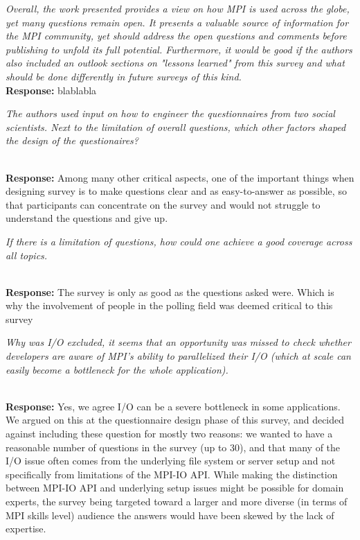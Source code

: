 \documentclass[11pt]{article}
\newcommand{\response}[2]{{\vspace{5mm}\noindent{\bf Comment:} \em #1}\\%
  {\bf Response:} #2}
\newcommand{\iresponse}[2]{{\item \em #1}\\%
  {\bf Response:} #2}
\begin{document}
\response{Overall, the work presented provides a view on how MPI is
  used across the globe, yet many questions remain open. It presents a
  valuable source of information for the MPI community, yet should
  address the open questions and comments before publishing to unfold
  its full potential. Furthermore, it would be good if the authors
  also included an outlook sections on "lessons learned" from this
  survey and what should be done differently in future surveys of this
  kind.}
         {
           blablabla
}

\begin{enumerate}
\iresponse{The authors used input on how to engineer the questionnaires
  from two social scientists. Next to the limitation of overall
  questions, which other factors shaped the design of the
  questionaires?}
{Among many other critical aspects, one of the important things when designing survey is to make
  questions clear and as easy-to-answer as possible, so that participants can
  concentrate on the survey and would not struggle to understand the questions and give up.}

\iresponse{If there is a limitation of questions, how could one
  achieve a good coverage across all topics.}
{The survey is only as good as the questions asked were. Which is why the involvement of
people in the polling field was deemed critical to this survey}

\iresponse{Why was I/O excluded, it seems that an opportunity was
  missed to check whether developers are aware of MPI's ability to
  parallelized their I/O (which at scale can easily become a
  bottleneck for the whole application).}
{
Yes, we agree I/O can be a severe bottleneck in some applications. We
argued on this at the questionnaire design phase of this survey, and decided
against including these question for mostly two reasons: we wanted to have
a reasonable number of questions in the survey (up to 30), and
that many of the I/O issue often comes from
the underlying file system or server setup and not specifically from limitations of the MPI-IO API.
While making the distinction between MPI-IO API and underlying setup issues might be possible for
domain experts, the survey being targeted toward a larger and more diverse (in terms of
MPI skills level) audience the answers would have been skewed by the lack of expertise.
}
\begin{comment}
 We thought it is very
difficult for some MPI users to distinguish whether the I/O issue comes
from the underlying file system or MPI-IO itself. This can be true
when MPI users are domain experts but they lack system knowledge. And
we decided not to have MPI-IO related questions.
\end{comment}


\end{enumerate}
\end{document}
